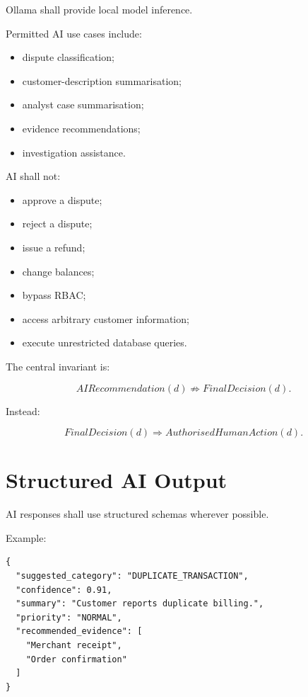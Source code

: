 \documentclass[11pt,a4paper]{article}
\begin{document}
Ollama shall provide local model inference.

Permitted AI use cases include:

\begin{itemize}
    \item dispute classification;
    \item customer-description summarisation;
    \item analyst case summarisation;
    \item evidence recommendations;
    \item investigation assistance.
\end{itemize}

AI shall not:

\begin{itemize}
    \item approve a dispute;
    \item reject a dispute;
    \item issue a refund;
    \item change balances;
    \item bypass RBAC;
    \item access arbitrary customer information;
    \item execute unrestricted database queries.
\end{itemize}

The central invariant is:

\[
AIRecommendation(d)
\not\Rightarrow
FinalDecision(d).
\]

Instead:

\[
FinalDecision(d)
\Rightarrow
AuthorisedHumanAction(d).
\]

\section{Structured AI Output}

AI responses shall use structured schemas wherever possible.

Example:

\begin{lstlisting}
{
  "suggested_category": "DUPLICATE_TRANSACTION",
  "confidence": 0.91,
  "summary": "Customer reports duplicate billing.",
  "priority": "NORMAL",
  "recommended_evidence": [
    "Merchant receipt",
    "Order confirmation"
  ]
}
\end{lstlisting}
\end{document}
